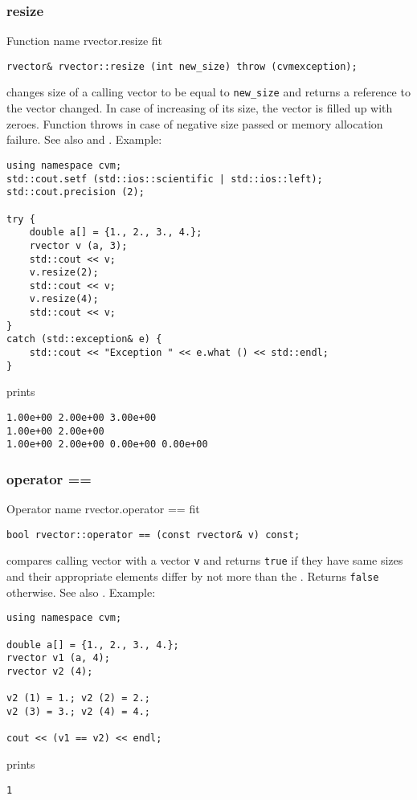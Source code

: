 \subsubsection{resize}
Function%
\pdfdest name {rvector.resize} fit
\begin{verbatim}
rvector& rvector::resize (int new_size) throw (cvmexception);
\end{verbatim}
changes size of a calling vector to be equal to
\verb"new_size" and returns a reference to
the vector changed.
In case of increasing of its size, the vector
is filled up with zeroes.
Function throws  
in case of negative size passed or memory allocation failure.
See also  and
.
Example:
\begin{Verbatim}
using namespace cvm;
std::cout.setf (std::ios::scientific | std::ios::left); 
std::cout.precision (2);

try {
    double a[] = {1., 2., 3., 4.};
    rvector v (a, 3);
    std::cout << v;
    v.resize(2);
    std::cout << v;
    v.resize(4);
    std::cout << v;
}
catch (std::exception& e) {
    std::cout << "Exception " << e.what () << std::endl;
}
\end{Verbatim}
prints
\begin{Verbatim}
1.00e+00 2.00e+00 3.00e+00
1.00e+00 2.00e+00
1.00e+00 2.00e+00 0.00e+00 0.00e+00
\end{Verbatim}
\newpage


\subsubsection{operator ==}
Operator%
\pdfdest name {rvector.operator ==} fit
\begin{verbatim}
bool rvector::operator == (const rvector& v) const;
\end{verbatim}
compares calling vector with a vector \verb"v"
and returns \verb"true" if they have same sizes
and their appropriate elements differ by not more than the
.
Returns \verb"false" otherwise.
See also .
Example:
\begin{Verbatim}
using namespace cvm;

double a[] = {1., 2., 3., 4.};
rvector v1 (a, 4);
rvector v2 (4);

v2 (1) = 1.; v2 (2) = 2.;
v2 (3) = 3.; v2 (4) = 4.;

cout << (v1 == v2) << endl;
\end{Verbatim}
prints
\begin{Verbatim}
1
\end{Verbatim}
\newpage




